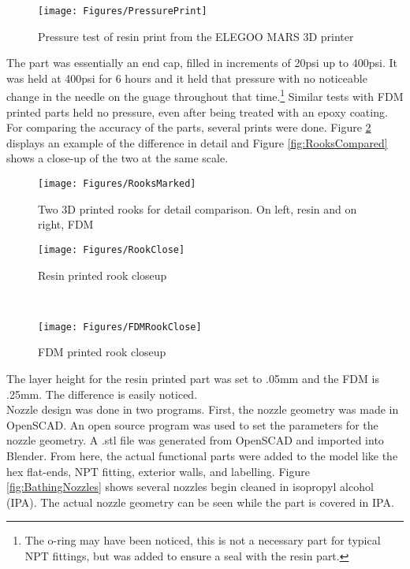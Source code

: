 \begin{figure}[h!]
\centering
\texttt{[image: Figures/PressurePrint]}
\caption{Pressure test of resin print from the ELEGOO MARS 3D printer}
\label{fig:PressurePrint}
\end{figure}
The part was essentially an end cap, filled in increments of 20psi up to 400psi. It was held at 400psi for 6 hours and it held that pressure with no noticeable change in the needle on the guage throughout that time.\footnote{The o-ring may have been noticed, this is not a necessary part for typical NPT fittings, but was added to ensure a seal with the resin part.} Similar tests with FDM printed parts held no pressure, even after being treated with an epoxy coating. For comparing the accuracy of the parts, several prints were done. Figure \ref{fig:Rooks} displays an example of the difference in detail and Figure \ref{fig:RooksCompared} shows a close-up of the two at the same scale.\clearpage
\begin{figure}[h!]
\centering
\texttt{[image: Figures/RooksMarked]}
\caption{Two 3D printed rooks for detail comparison. On left, resin and on right, FDM}
\label{fig:Rooks}
\end{figure}
\begin{figure*}[h!]
    \centering
    \begin{subfigure}[t]{0.5\textwidth}
        \centering
        \texttt{[image: Figures/RookClose]}
        \caption{Resin printed rook closeup}
    \end{subfigure}%
    ~ 
    \begin{subfigure}[t]{0.5\textwidth}
        \centering
        \texttt{[image: Figures/FDMRookClose]}
        \caption{FDM printed rook closeup}
    \end{subfigure}
    \caption{Rook closeups}
\label{fig:RooksCompared}
\end{figure*}
The layer height for the resin printed part was set to .05mm and the FDM is .25mm. The difference is easily noticed.\\
Nozzle design was done in two programs. First, the nozzle geometry was made in OpenSCAD. An open source program was used to set the parameters for the nozzle geometry. A .stl file was generated from OpenSCAD and imported into Blender. From here, the actual functional parts were added to the model like the hex flat-ends, NPT fitting, exterior walls, and labelling. Figure \ref{fig:BathingNozzles} shows several nozzles begin cleaned in isopropyl alcohol (IPA). The actual nozzle geometry can be seen while the part is covered in IPA.

